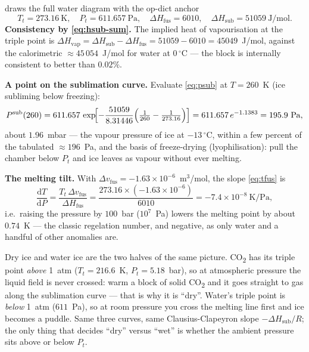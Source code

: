 \documentclass[11pt,a4paper]{article}
\newcommand{\Hvap}{\Delta H_{\!\mathrm{vap}}}
\newcommand{\Hsub}{\Delta H_{\!\mathrm{sub}}}
\newcommand{\Hfus}{\Delta H_{\!\mathrm{fus}}}
\begin{document}
\begin{example}
 draws the full water
diagram with the op-dict anchor
\[
   T_t = 273.16~\mathrm{K},\quad
   P_t = 611.657~\mathrm{Pa},\quad
   \Delta H_{\mathrm{fus}} = 6010,\quad
   \Delta H_{\mathrm{sub}} = 51059~\mathrm{J/mol}.
\]
\textbf{Consistency by \eqref{eq:hsub-sum}.}  The implied heat of
vapourisation at the triple point is
$\Hvap = \Hsub-\Hfus = 51059-6010 = 45049$~J/mol, against the
calorimetric $\approx 45\,054$~J/mol for water at $0\,^\circ$C --- the
block is internally consistent to better than $0.02\%$.

\textbf{A point on the sublimation curve.}  Evaluate
\eqref{eq:psub} at $T = 260$~K (ice subliming below freezing):
\[
   P^{\mathrm{sub}}(260)
   = 611.657\,
     \exp\!\Bigl[-\frac{51059}{8.31446}
        \Bigl(\tfrac{1}{260}-\tfrac{1}{273.16}\Bigr)\Bigr]
   = 611.657\,e^{-1.1383}
   = 195.9~\mathrm{Pa},
\]
about $1.96$~mbar --- the vapour pressure of ice at $-13\,^\circ$C,
within a few percent of the tabulated $\approx 196$~Pa, and the basis
of freeze-drying (lyophilisation): pull the chamber below $P_t$ and
ice leaves as vapour without ever melting.

\textbf{The melting tilt.}  With $\Delta v_{\mathrm{fus}}=-1.63\times
10^{-6}$~m$^3$/mol, the slope \eqref{eq:tfus} is
\[
   \frac{\mathrm{d}T}{\mathrm{d}P}
   = \frac{T_t\,\Delta v_{\mathrm{fus}}}{\Hfus}
   = \frac{273.16\times(-1.63\times10^{-6})}{6010}
   = -7.4\times10^{-8}~\mathrm{K/Pa},
\]
i.e.\ raising the pressure by $100$~bar ($10^7$~Pa) lowers the melting
point by about $0.74$~K --- the classic regelation number, and
negative, as only water and a handful of other anomalies are.
\end{example}

\begin{intuition}
Dry ice and water ice are the two halves of the same picture.
CO\textsubscript{2} has its triple point \emph{above} 1~atm
($T_t=216.6$~K, $P_t=5.18$~bar), so at atmospheric pressure the liquid
field is never crossed: warm a block of solid CO\textsubscript{2} and
it goes straight to gas along the sublimation curve --- that is why it
is ``dry''.  Water's triple point is \emph{below} 1~atm
($611$~Pa), so at room pressure you cross the melting line first and
ice becomes a puddle.  Same three curves, same Clausius-Clapeyron
slope $-\Hsub/R$; the only thing that decides ``dry'' versus ``wet''
is whether the ambient pressure sits above or below $P_t$.
\end{intuition}
\end{document}
